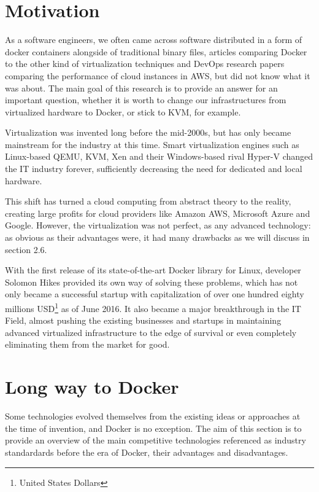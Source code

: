 
\section{Motivation}

As a software engineers,
we often came across software distributed
in a form of docker containers alongside
of traditional binary files,
articles comparing Docker to the other kind of virtualization techniques
and DevOps research papers comparing the performance of cloud instances in AWS,
but did not know what it was about.
The main goal of this research is to provide an answer
for an important question, whether it is worth
to change our infrastructures
from virtualized hardware to Docker, or stick to KVM, for example.

Virtualization was invented long before the mid-2000s,
but has only became mainstream for the industry at this time.
Smart virtualization engines such as Linux-based QEMU, KVM, Xen
and their Windows-based rival Hyper-V changed the IT industry forever,
sufficiently decreasing the need for dedicated and local hardware.

This shift has turned a cloud computing from abstract theory to the reality,
creating large profits for cloud providers like Amazon AWS,
Microsoft Azure and Google.
However, the virtualization was not perfect, as any advanced technology:
as obvious as their advantages were, it had many
drawbacks as we will discuss in section 2.6.

With the first release of its state-of-the-art Docker library for Linux,
developer Solomon Hikes provided its own way of solving these problems,
which has not only became a successful startup
with capitalization of over one hundred eighty millions
USD\footnote{United States Dollars} as of June 2016\cite{DockerCapitalization}.
It also became a major breakthrough in the IT Field, almost pushing the existing
businesses and startups in maintaining advanced virtualized infrastructure
to the edge of survival or even completely eliminating
them from the market for good\cite{DockerImpact}.

\section{Long way to Docker}

Some technologies evolved themselves from the existing ideas
or approaches at the time of invention, and Docker is no exception.
The aim of this section is to provide an overview of the main competitive
technologies referenced as industry standardards
before the era of Docker, their advantages and disadvantages.

